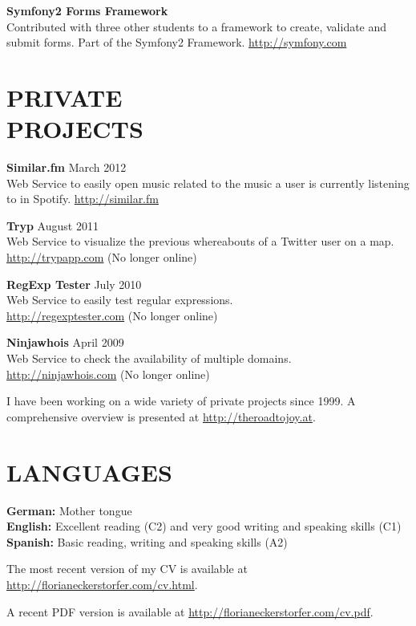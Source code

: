 \documentclass[margin]{res}
\begin{document}
\begin{resume}
\textbf{Symfony2 Forms Framework} \\
	Contributed with three other students to a framework to create, validate and submit forms. Part of the Symfony2 Framework. \url{http://symfony.com}

\section{PRIVATE \\ PROJECTS}

\textbf{Similar.fm} \hfill March 2012 \\
	Web Service to easily open music related to the music a user is currently listening to in Spotify. \url{http://similar.fm}

\textbf{Tryp} \hfill August 2011 \\
	Web Service to visualize the previous whereabouts of a Twitter user on a map. \\ \url{http://trypapp.com} (No longer online)

\textbf{RegExp Tester} \hfill July 2010 \\
	Web Service to easily test regular expressions. \\ \url{http://regexptester.com} (No longer online)

\textbf{Ninjawhois} \hfill April 2009 \\
	Web Service to check the availability of multiple domains. \\ \url{http://ninjawhois.com} (No longer online)

I have been working on a wide variety of private projects since 1999. A comprehensive overview is presented at \url{http://theroadtojoy.at}.


\section{LANGUAGES}

\textbf{German:} Mother tongue \\
\textbf{English:} Excellent reading (C2) and very good writing and speaking skills (C1) \\
\textbf{Spanish:} Basic reading, writing and speaking skills (A2)


\end{resume}

\vspace{15 mm}

The most recent version of my CV is available at \url{http://florianeckerstorfer.com/cv.html}.

A recent PDF version is available at \url{http://florianeckerstorfer.com/cv.pdf}.
\end{document}
